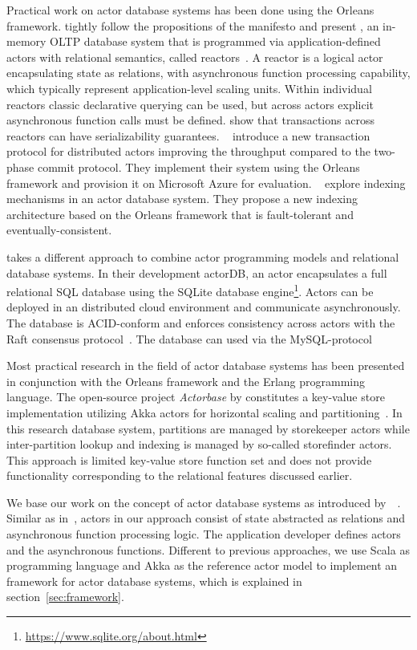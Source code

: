   Practical work on actor database systems has been done using the Orleans framework.
  \citeauthor{Shah:reactdb} tightly follow the propositions of the manifesto and present \reactdb{},
  an in-memory OLTP database system that is programmed via application-defined actors with relational semantics, called reactors~\cite{Shah:reactdb}.
  A reactor is a logical actor encapsulating state as relations, with asynchronous function processing capability, which typically represent application-level scaling units.
  Within individual reactors classic declarative querying can be used, but across actors explicit asynchronous function calls must be defined.
  \citeauthor{Shah:reactdb} show that transactions across reactors can have serializability guarantees.
  \citeauthor{Eldeeb:transactions}~\cite{Eldeeb:transactions} introduce a new transaction protocol for distributed actors improving the throughput compared to the two-phase commit protocol.
  They implement their system using the Orleans framework and provision it on Microsoft Azure for evaluation. %
  \citeauthor{Bernstein:indexing}~\cite{Bernstein:indexing} explore indexing mechanisms in an actor database system.
  They propose a new indexing architecture based on the Orleans framework that is fault-tolerant and eventually-consistent.

  \citeauthor{biokoda:actordb} takes a different approach to combine actor programming models and relational database systems.
  In their development actorDB, an actor encapsulates a full relational SQL database using the SQLite database engine\footnote{\url{https://www.sqlite.org/about.html}}.
  Actors can be deployed in an distributed cloud environment and communicate asynchronously.
  The database is ACID-conform and enforces consistency across actors with the Raft consensus protocol~\cite{raft}.
  The database can used via the MySQL-protocol

  Most practical research in the field of actor database systems has been presented in conjunction with the Orleans framework and the Erlang programming language.
  The open-source project \textit{Actorbase} by \citeauthor{actorbase} constitutes a key-value store implementation utilizing Akka actors for horizontal scaling and partitioning~\cite{actorbase}.
  In this research database system, partitions are managed by storekeeper actors while inter-partition lookup and indexing is managed by so-called storefinder actors.
  This approach is limited key-value store function set and does not provide functionality corresponding to the relational features discussed earlier.
  
  We base our work on the concept of actor database systems as introduced by~\citeauthor{manifesto}~\cite{manifesto}.
  Similar as in~\cite{Shah:reactdb}, actors in our approach consist of state abstracted as relations and asynchronous function processing logic.
  The application developer defines actors and the asynchronous functions.
  Different to previous approaches, we use Scala as programming language and Akka as the reference actor model to implement an framework for actor database systems, which is explained in section~\ref{sec:framework}.